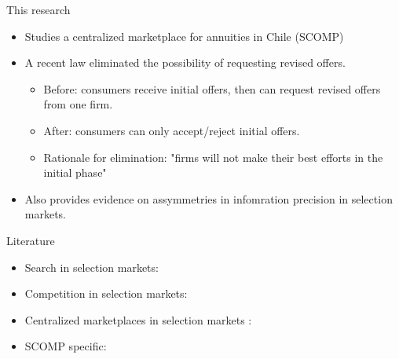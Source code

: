 \documentclass[10pt,aspectratio=169]{beamer}
\begin{document}
\begin{frame}{This research}
\begin{itemize}
    \item Studies a centralized marketplace for annuities in Chile (SCOMP)
    \item A recent law eliminated the possibility of requesting revised offers.
    \begin{itemize}
        \item Before: consumers receive initial offers, then can request revised offers from one firm.
        \item After: consumers can only accept/reject initial offers.
        \item Rationale for elimination: "firms will not make their best efforts in the initial phase"
    \end{itemize}
    \item Also provides evidence on assymmetries in infomration precision in selection markets. 
\end{itemize}
\end{frame}


\begin{frame}{Literature}


\begin{itemize}
    \item Search in selection markets: \textcite{allen_search_2019} %


    \item Competition in selection markets: \textcite{mahoney_imperfect_2017, cuesta_price_2018, cosconati_competing_2025} %

    \item Centralized marketplaces in selection markets : %
    
    \item SCOMP specific: %
    

     
\end{itemize}
\note{
\textcolor{blue}{ ADD THE CONTRIBUTIONS TO EACH LITERATURE AND ADD MORE PAPERS}
}
\end{frame}
\end{document}
